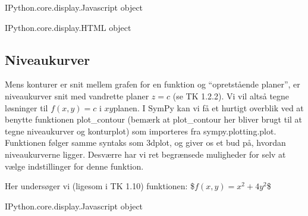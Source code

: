 \documentclass[letterpaper,10pt,english]{jupyterBook}
\begin{document}
\begin{sphinxVerbatim}[commandchars=\\\{\}]
\PYGZlt{}IPython.core.display.Javascript object\PYGZgt{}
\end{sphinxVerbatim}

\begin{sphinxVerbatim}[commandchars=\\\{\}]
\PYGZlt{}IPython.core.display.HTML object\PYGZgt{}
\end{sphinxVerbatim}


\subsection{Niveaukurver}
\label{\detokenize{notebooks/sympy/Notebook_FlereVar_plot:niveaukurver}}
Mens konturer er snit mellem grafen for en funktion og “opretstående planer”, er niveaukurver snit med vandrette planer \(z=c\) (se TK 1.2.2). Vi vil altså tegne løsninger til \(f(x,y) = c\) i \(xy\)\sphinxhyphen{}planen. I SymPy kan vi få et hurtigt overblik ved at benytte funktionen plot\_contour (bemærk at plot\_contour her bliver brugt til at tegne niveaukurver og  konturplot) som importeres fra sympy.plotting.plot. Funktionen følger samme syntaks som 3dplot, og giver os et bud på, hvordan niveaukurverne ligger. Desværre har vi ret begrænsede muligheder for selv at vælge indstillinger for denne funktion.

Her undersøger vi (ligesom i TK 1.10) funktionen:
\$\( f(x, y) = x^2 + 4y^2 \)\$

\begin{sphinxVerbatim}[commandchars=\\\{\}]
   
          

        
\end{sphinxVerbatim}

\begin{sphinxVerbatim}[commandchars=\\\{\}]
\PYGZlt{}IPython.core.display.Javascript object\PYGZgt{}
\end{sphinxVerbatim}
\end{document}
